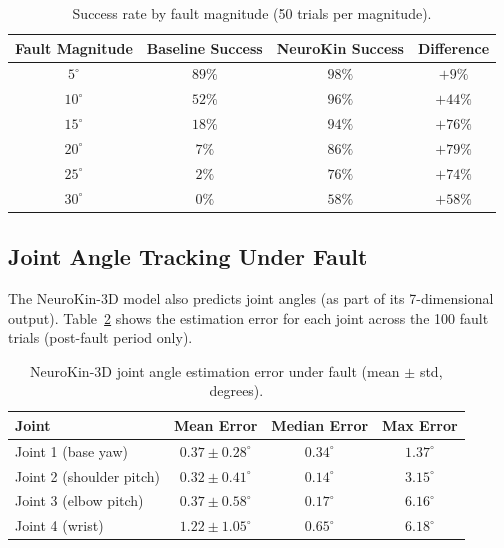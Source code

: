 ﻿\documentclass[12pt,a4paper,oneside]{report}
\begin{document}
\begin{table}[H]
\centering
\caption{Success rate by fault magnitude (50 trials per magnitude).}
\label{tab:fault_sweep}
\begin{tabular}{cccc}
\toprule
\textbf{Fault Magnitude} & \textbf{Baseline Success} & \textbf{NeuroKin Success} & \textbf{Difference} \\
\midrule
$5^\circ$ & $89\%$ & $98\%$ & $+9\%$ \\
$10^\circ$ & $52\%$ & $96\%$ & $+44\%$ \\
$15^\circ$ & $18\%$ & $94\%$ & $+76\%$ \\
$20^\circ$ & $7\%$ & $86\%$ & $+79\%$ \\
$25^\circ$ & $2\%$ & $76\%$ & $+74\%$ \\
$30^\circ$ & $0\%$ & $58\%$ & $+58\%$ \\
\bottomrule
\end{tabular}
\end{table}

\subsection{Joint Angle Tracking Under Fault}

The NeuroKin-3D model also predicts joint angles (as part of its 7-dimensional output). Table~\ref{tab:joint_tracking} shows the estimation error for each joint across the 100 fault trials (post-fault period only).

\begin{table}[H]
\centering
\caption{NeuroKin-3D joint angle estimation error under fault (mean $\pm$ std, degrees).}
\label{tab:joint_tracking}
\begin{tabular}{lccc}
\toprule
\textbf{Joint} & \textbf{Mean Error} & \textbf{Median Error} & \textbf{Max Error} \\
\midrule
Joint 1 (base yaw) & $0.37 \pm 0.28^\circ$ & $0.34^\circ$ & $1.37^\circ$ \\
Joint 2 (shoulder pitch) & $0.32 \pm 0.41^\circ$ & $0.14^\circ$ & $3.15^\circ$ \\
Joint 3 (elbow pitch) & $0.37 \pm 0.58^\circ$ & $0.17^\circ$ & $6.16^\circ$ \\
Joint 4 (wrist) & $1.22 \pm 1.05^\circ$ & $0.65^\circ$ & $6.18^\circ$ \\
\bottomrule
\end{tabular}
\end{table}
\end{document}
